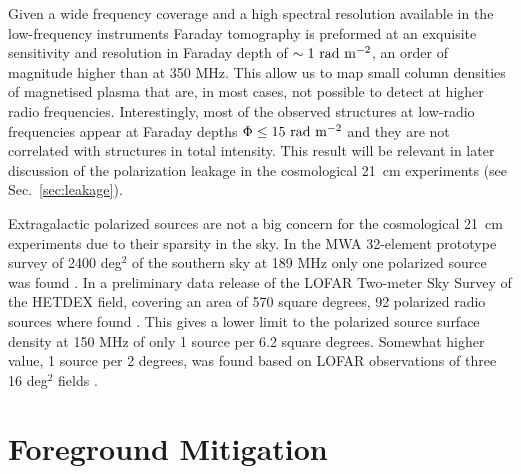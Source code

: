 Given a wide frequency coverage and a high spectral resolution available in the low-frequency instruments Faraday tomography is preformed at an exquisite sensitivity and resolution in Faraday depth of $\sim1~{\rm rad~m^{-2}}$, an order of magnitude higher than at 350 MHz. This allow us to map small column densities of magnetised plasma that are, in most cases, not possible to detect at higher radio frequencies. Interestingly, most of the observed structures at low-radio frequencies appear at Faraday depths $\Phi\leq15~{\rm rad~m^{-2}}$ and they are not correlated with structures in total intensity. This result will be relevant in later discussion of the polarization leakage in the cosmological 21~cm experiments (see Sec.~\ref{sec:leakage}).

Extragalactic polarized sources are not a big concern for the cosmological 21~cm experiments due to their sparsity in the sky. In the MWA 32-element prototype survey of 2400 deg$^2$ of the southern sky at 189 MHz only one polarized source was found \cite{bernardi13}. In a preliminary data release of the LOFAR Two-meter Sky Survey of the HETDEX field, covering an area of 570 square degrees, 92 polarized radio sources where found \cite{vaneck18}. This gives a lower limit to the polarized source surface density at 150 MHz of only 1 source per 6.2 square degrees. Somewhat higher value, 1 source per 2 degrees, was found based on LOFAR observations of three 16 deg$^2$ fields \cite{jelic15, mulcahy14, vaneck18}.
 
\section{Foreground Mitigation}\label{sec:fgmit}

